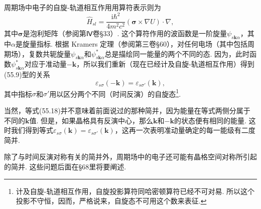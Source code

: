 周期场中电子的自旋-轨道相互作用用算符表示则为
\begin{equation}
\hat H_{sl}=\frac{\mathrm i\hbar^2}{4m^2c^2}(\bm\sigma\times\nabla U)\cdot\nabla,
\label{55.17}
\end{equation}
其中$\bm\sigma$是泡利矩阵（参阅第Ⅳ卷§33）. 这个算符作用的波函数是一阶旋量$\psi_{s\bm k\alpha}$，其中$\alpha$是旋量指标. 根据 Kramers 定理（参阅第三卷§60），对任何电场（其中包括周期场），复数共轭旋量$\psi_{s\bm k\alpha}$和$\psi^{*}_{s\bm k\alpha}$总是描绘同一能量的两个不同的态. 因为，此时函数$\psi^{*}_{s\bm k\alpha}$对应于准动量$-\bm k$，所以我们重新（现在已经计及自旋-轨道相互作用）得到(55.9)型的关系
\begin{equation}
\varepsilon_{s\sigma}(-\bm k)=\varepsilon_{s\sigma'}(\bm k),
\label{55.18}
\end{equation}
其中指标$\sigma$和$\sigma'$用以区分两个不同（时间反演）的自旋态\footnote{计及自旋-轨道相互作用，自旋投影算符同哈密顿算符已经不可对易. 所以这个投影不守恒，因而，严格说来，自旋态不可用这个数来表征.}.

当然，等式(55.18)并不意味着前面说过的那种简并，因为能量在等式两侧分属于不同的$\bm k$值. 但是，如果晶格具有反演中心，那么$\bm k$和$-\bm k$的状态便有相同的能量. 这时我们得到等式$\varepsilon_{s\sigma}(\bm k)=\varepsilon_{s\sigma'}(\bm k)$，这再一次表明准动量确定的每一能级有二度简并.

除了与时间反演对称有关的简并外，周期场中的电子还可能有晶格空间对称所引起的简并. 这些问题后面在§68里将要阐述.

